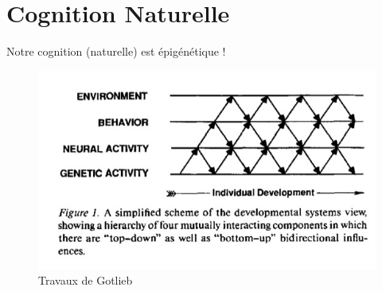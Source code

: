 \documentclass{beamer}
\begin{document}
\section{Cognition Naturelle}

\begin{frame}{Notre cognition (naturelle) est épigénétique !}
\begin{figure}
    \centering
    \includegraphics[width=\textwidth]{epigeneticScheme.png}
    \caption{Travaux de Gotlieb}
    \label{fig:my_label}
\end{figure}{}
    
\end{frame}
\end{document}
